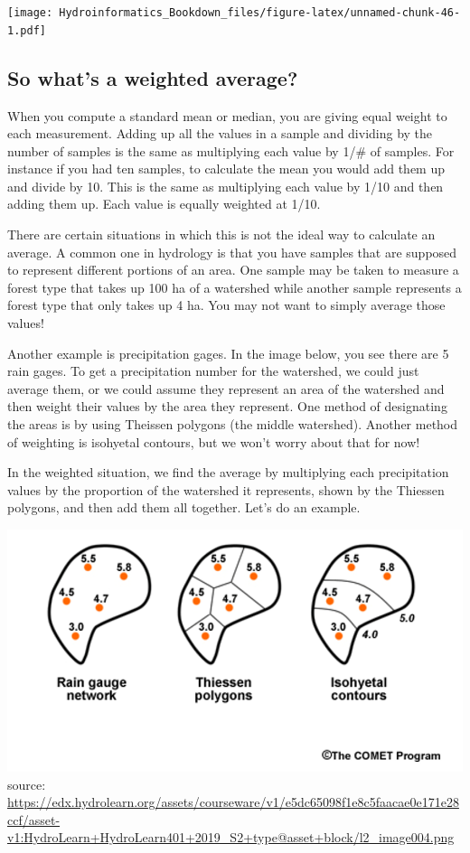 \documentclass[
]{book}
\begin{document}
\texttt{[image: Hydroinformatics\_Bookdown\_files/figure-latex/unnamed-chunk-46-1.pdf]}

\hypertarget{so-whats-a-weighted-average}{%
\subsection{So what's a weighted average?}\label{so-whats-a-weighted-average}}

When you compute a standard mean or median, you are giving equal weight to each measurement. Adding up all the values in a sample and dividing by the number of samples is the same as multiplying each value by 1/\# of samples. For instance if you had ten samples, to calculate the mean you would add them up and divide by 10. This is the same as multiplying each value by 1/10 and then adding them up. Each value is equally weighted at 1/10.

There are certain situations in which this is not the ideal way to calculate an average. A common one in hydrology is that you have samples that are supposed to represent different portions of an area. One sample may be taken to measure a forest type that takes up 100 ha of a watershed while another sample represents a forest type that only takes up 4 ha. You may not want to simply average those values!

Another example is precipitation gages. In the image below, you see there are 5 rain gages. To get a precipitation number for the watershed, we could just average them, or we could assume they represent an area of the watershed and then weight their values by the area they represent. One method of designating the areas is by using Theissen polygons (the middle watershed). Another method of weighting is isohyetal contours, but we won't worry about that for now!

In the weighted situation, we find the average by multiplying each precipitation values by the proportion of the watershed it represents, shown by the Thiessen polygons, and then add them all together. Let's do an example.

\includegraphics{images/theissen.png}source: \url{https://edx.hydrolearn.org/assets/courseware/v1/e5dc65098f1e8c5faacae0e171e28ccf/asset-v1:HydroLearn+HydroLearn401+2019_S2+type@asset+block/l2_image004.png}
\end{document}
